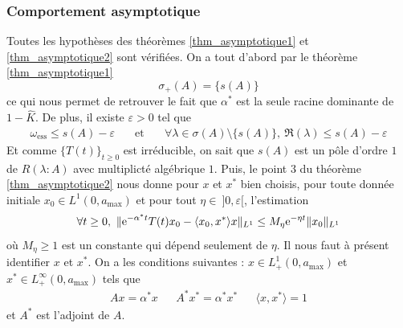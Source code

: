 \subsubsection{Comportement asymptotique}
Toutes les hypothèses des théorèmes \ref{thm_asymptotique1} et \ref{thm_asymptotique2} sont vérifiées. On a tout d'abord par le théorème \ref{thm_asymptotique1}
\begin{equation*}
    \sigma_+(A)=\{s(A)\}
\end{equation*}
ce qui nous permet de retrouver le fait que $\alpha^*$ est la seule racine dominante de $1-\hat{K}$. De plus, il existe $\varepsilon >0$ tel que 
\begin{eqnarray*}
    \omega_{\text{ess}} \leq s(A)-\varepsilon \ \ \ &\text{ et }& \ \ \ \forall \lambda \in \sigma(A) \setminus \{s(A)\}, \ \Re(\lambda) \leq s(A)- \varepsilon
\end{eqnarray*}
Et comme $\big\{T(t)\big\}_{t \geq 0}$ est irréducible, on sait que $s(A)$ est un pôle d'ordre $1$ de $R(\lambda : A)$ avec multiplicté algébrique $1$. Puis, le point $3$ du théorème \ref{thm_asymptotique2} nous donne pour $x$ et $x^*$ bien choisis, pour toute donnée initiale $x_0 \in L^1(0,a_{\max})$ et pour tout $\eta \in \ ]0,\varepsilon[$, l'estimation 
\begin{equation}\label{estim_SG}
    \forall t \geq 0, \ \|\mathrm{e}^{-\alpha^*t}T(t)x_0 - \langle x_0,x^*\rangle x\|_{L^1} \leq M_\eta\mathrm{e}^{-\eta t}\|x_0\|_{L^1}
\end{equation}
où $M_\eta \geq 1$ est un constante qui dépend seulement de $\eta$. Il nous faut à présent identifier $x$ et $x^*$. On a les conditions suivantes : $x \in L_+^1(0,a_{\max})$ et $x^* \in L^\infty_+(0,a_{\max})$ tels que 
\begin{equation*}
    \begin{array}{ccccc}
        Ax = \alpha^*x && A^*x^* = \alpha^*x^* && \langle x,x^*\rangle =1
    \end{array}
\end{equation*}
et $A^*$ est l'adjoint de $A$.
